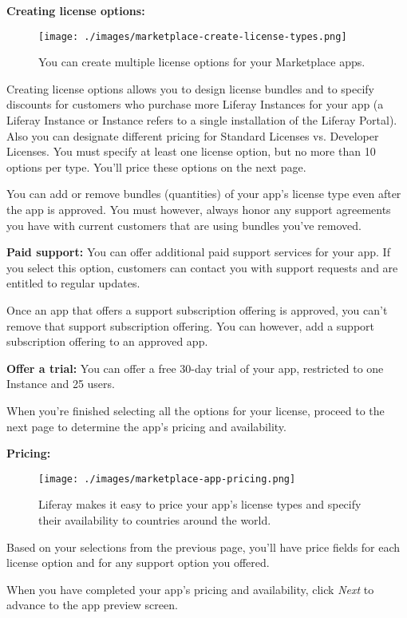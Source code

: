 \textbf{Creating license options:}

\begin{figure}
\centering
\texttt{[image: ./images/marketplace-create-license-types.png]}
\caption{You can create multiple license options for your Marketplace
apps.}
\end{figure}

Creating license options allows you to design license bundles and to
specify discounts for customers who purchase more Liferay Instances for
your app (a Liferay Instance or Instance refers to a single installation
of the Liferay Portal). Also you can designate different pricing for
Standard Licenses vs. Developer Licenses. You must specify at least one
license option, but no more than 10 options per type. You'll price these
options on the next page.

You can add or remove bundles (quantities) of your app's license type
even after the app is approved. You must however, always honor any
support agreements you have with current customers that are using
bundles you've removed.

\textbf{Paid support:} You can offer additional paid support services
for your app. If you select this option, customers can contact you with
support requests and are entitled to regular updates.

Once an app that offers a support subscription offering is approved, you
can't remove that support subscription offering. You can however, add a
support subscription offering to an approved app.

\textbf{Offer a trial:} You can offer a free 30-day trial of your app,
restricted to one Instance and 25 users.

When you're finished selecting all the options for your license, proceed
to the next page to determine the app's pricing and availability.

\textbf{Pricing:}

\begin{figure}
\centering
\texttt{[image: ./images/marketplace-app-pricing.png]}
\caption{Liferay makes it easy to price your app's license types and
specify their availability to countries around the world.}
\end{figure}

Based on your selections from the previous page, you'll have price
fields for each license option and for any support option you offered.

When you have completed your app's pricing and availability, click
\emph{Next} to advance to the app preview screen.

